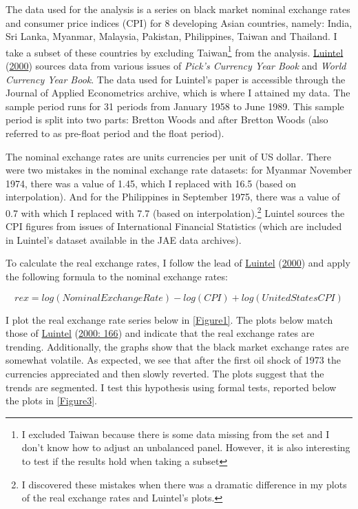 \documentclass[11pt,preprint, authoryear]{elsarticle}
\numberwithin{equation}{section}
\numberwithin{figure}{section}
\numberwithin{table}{section}
\let\rmarkdownfootnote\footnote%
\def\footnote{\protect\rmarkdownfootnote}
\begin{document}
The data used for the analysis is a series on black market nominal
exchange rates and consumer price indices (CPI) for 8 developing Asian
countries, namely: India, Sri Lanka, Myanmar, Malaysia, Pakistan,
Philippines, Taiwan and Thailand. I take a subset of these countries by
excluding Taiwan\footnote{I excluded Taiwan because there is some data
  missing from the set and I don't know how to adjust an unbalanced
  panel. However, it is also interesting to test if the results hold
  when taking a subset} from the analysis.
\protect\hyperlink{ref-Kul}{Luintel} (\protect\hyperlink{ref-Kul}{2000})
sources data from various issues of \emph{Pick's Currency Year Book} and
\emph{World Currency Year Book}. The data used for Luintel's paper is
accessible through the Journal of Applied Econometrics archive, which is
where I attained my data. The sample period runs for 31 periods from
January 1958 to June 1989. This sample period is split into two parts:
Bretton Woods and after Bretton Woods (also referred to as pre-float
period and the float period).

The nominal exchange rates are units currencies per unit of US dollar.
There were two mistakes in the nominal exchange rate datasets: for
Myanmar November 1974, there was a value of 1.45, which I replaced with
16.5 (based on interpolation). And for the Philippines in September
1975, there was a value of 0.7 with which I replaced with 7.7 (based on
interpolation).\footnote{I discovered these mistakes when there was a
  dramatic difference in my plots of the real exchange rates and
  Luintel's plots.} Luintel sources the CPI figures from issues of
International Financial Statistics (which are included in Luintel's
dataset available in the JAE data archives).

To calculate the real exchange rates, I follow the lead of
\protect\hyperlink{ref-Kul}{Luintel} (\protect\hyperlink{ref-Kul}{2000})
and apply the following formula to the nominal exchange rates:

\[
rex = log(Nominal Exchange Rate) - log(CPI) + log(United States CPI)
\]

I plot the real exchange rate series below in \ref{Figure1}. The plots
below match those of \protect\hyperlink{ref-Kul}{Luintel}
(\protect\hyperlink{ref-Kul}{2000: 166}) and indicate that the real
exchange rates are trending. Additionally, the graphs show that the
black market exchange rates are somewhat volatile. As expected, we see
that after the first oil shock of 1973 the currencies appreciated and
then slowly reverted. The plots suggest that the trends are segmented. I
test this hypothesis using formal tests, reported below the plots in
\ref{Figure3}.
\end{document}
